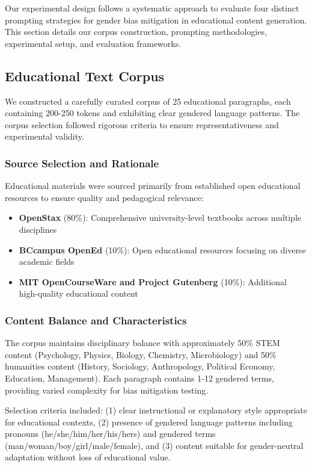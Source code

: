 Our experimental design follows a systematic approach to evaluate four distinct prompting strategies for gender bias mitigation in educational content generation. This section details our corpus construction, prompting methodologies, experimental setup, and evaluation frameworks.

\subsection{Educational Text Corpus}

We constructed a carefully curated corpus of 25 educational paragraphs, each containing 200-250 tokens and exhibiting clear gendered language patterns. The corpus selection followed rigorous criteria to ensure representativeness and experimental validity.

\subsubsection{Source Selection and Rationale}
Educational materials were sourced primarily from established open educational resources to ensure quality and pedagogical relevance:
\begin{itemize}
    \item \textbf{OpenStax} (80\%): Comprehensive university-level textbooks across multiple disciplines
    \item \textbf{BCcampus OpenEd} (10\%): Open educational resources focusing on diverse academic fields  
    \item \textbf{MIT OpenCourseWare and Project Gutenberg} (10\%): Additional high-quality educational content
\end{itemize}

\subsubsection{Content Balance and Characteristics}
The corpus maintains disciplinary balance with approximately 50\% STEM content (Psychology, Physics, Biology, Chemistry, Microbiology) and 50\% humanities content (History, Sociology, Anthropology, Political Economy, Education, Management). Each paragraph contains 1-12 gendered terms, providing varied complexity for bias mitigation testing.

Selection criteria included: (1) clear instructional or explanatory style appropriate for educational contexts, (2) presence of gendered language patterns including pronouns (he/she/him/her/his/hers) and gendered terms (man/woman/boy/girl/male/female), and (3) content suitable for gender-neutral adaptation without loss of educational value.

